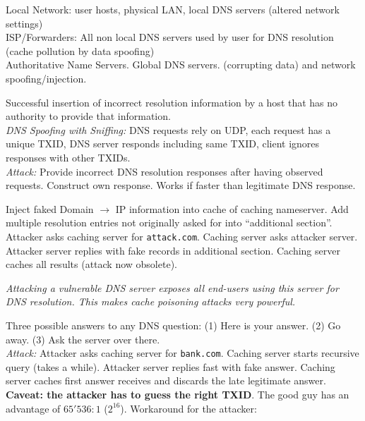 Local Network: user hosts, physical LAN, local DNS servers (altered network settings)\\
ISP/Forwarders: All non local DNS servers used by user for DNS resolution (cache pollution by data spoofing) \\
Authoritative Name Servers. Global DNS servers. (corrupting data) and network spoofing/injection.

 Successful insertion of incorrect resolution information by a host that has no authority to provide that information. \\
\textit{DNS Spoofing with Sniffing:} DNS requests rely on UDP, each request has a unique TXID, DNS server responds including same TXID, client ignores responses with other TXIDs.\\
\textit{Attack:} Provide incorrect DNS resolution responses after having observed requests. Construct own response. Works if faster than legitimate DNS response.

 Inject faked Domain $\to$ IP information into cache of caching nameserver. Add multiple resolution entries not originally asked for into ``additional section''. Attacker asks caching server for {\tt attack.com}. Caching server asks attacker server. Attacker server replies with fake records in additional section. Caching server caches all results (attack now obsolete).

\textit{Attacking a vulnerable DNS server exposes all end-users using this server for DNS resolution. This makes cache poisoning attacks very powerful.}

 Three possible answers to any DNS question: (1) Here is your answer. (2) Go away. (3) Ask the server over there. \\
\textit{Attack:} Attacker asks caching server for {\tt bank.com}. Caching server starts recursive query (takes a while). Attacker server replies fast with fake answer. Caching server caches first answer receives and discards the late legitimate answer. \textbf{Caveat: the attacker has to guess the right TXID}. The good guy has an advantage of $65'536:1$ ($2^{16}$). Workaround for the attacker:

